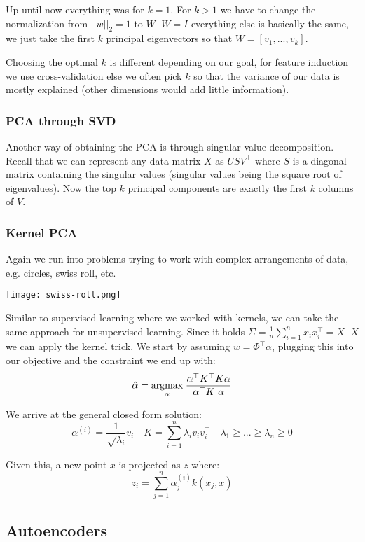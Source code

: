 Up until now everything was for $k = 1$. For $k > 1$ we have to change the normalization from $||w||_2 = 1$ to $W^\top W = I$ everything else is basically the same, we just take the first $k$ principal eigenvectors so that $W = [v_1, ..., v_k]$.

Choosing the optimal $k$ is different depending on our goal, for feature induction we use cross-validation else we often pick $k$ so that the variance of our data is mostly explained (other dimensions would add little information).

\subsubsection{PCA through SVD}

Another way of obtaining the PCA is through singular-value decomposition. Recall that we can represent any data matrix $X$ as $U S V^\top$ where $S$ is a diagonal matrix containing the singular values (singular values being the square root of eigenvalues). Now the top $k$ principal components are exactly the first $k$ columns of $V$.

\subsubsection{Kernel PCA}

Again we run into problems trying to work with complex arrangements of data, e.g. circles, swiss roll, etc.

\begin{center}
	\texttt{[image: swiss-roll.png]}
\end{center}

Similar to supervised learning where we worked with kernels, we can take the same approach for unsupervised learning. Since it holds $\Sigma = \frac{1}{n} \sum_{i=1}^n x_i x_i^\top = X^\top X$ we can apply the kernel trick. We start by assuming $w = \Phi^\top \alpha$, plugging this into our objective and the constraint we end up with:
$$\hat{\alpha} = \argmax{\alpha} \; \frac{\alpha^\top K^\top K \alpha}{\alpha^\top K \alpha}$$

We arrive at the general closed form solution:
$$\alpha^{(i)} = \frac{1}{\sqrt{\lambda_i}}v_i \quad K = \sum_{i = 1}^n \lambda_i v_i v_i^\top \quad \lambda_1 \geq ... \geq \lambda_n \geq 0$$

Given this, a new point $x$ is projected as $z$ where:
$$z_i = \sum_{j=1}^n \alpha_j^{(i)} k(x_j, x)$$

\subsection{Autoencoders}

